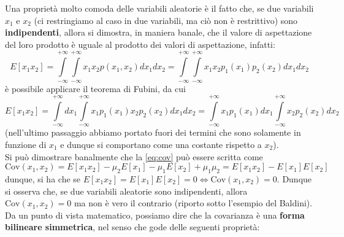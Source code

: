 \documentclass{report}
\begin{document}
Una proprietà molto comoda delle variabili aleatorie è il fatto che, se due variabili $x_1$ e $x_2$ (ci restringiamo al caso in due variabili, ma ciò non è restrittivo) sono \textbf{indipendenti}, allora si dimostra, in maniera banale, che il valore di aspettazione del loro prodotto è uguale al prodotto dei valori di aspettazione, infatti:
$$
E[x_1 x_2] = \int\limits_{-\infty}^{+\infty} \int\limits_{-\infty}^{+\infty} x_1 x_2 p(x_1, x_2)dx_1 dx_2 = \int\limits_{-\infty}^{+\infty} \int\limits_{-\infty}^{+\infty} x_1 x_2 p_1(x_1)p_2(x_2)dx_1 dx_2
$$ 
è possibile applicare il teorema di Fubini, da cui
$$
E[x_1 x_2] = \int\limits_{-\infty}^{+\infty} dx_1 \int\limits_{-\infty}^{+\infty} x_1 p_1(x_1) x_2 p_2(x_2) dx_1dx_2 = \int\limits_{-\infty}^{+\infty} x_1 p_1(x_1) dx_1 \int\limits_{-\infty}^{+\infty} x_2 p_2(x_2) dx_2
$$
(nell'ultimo passaggio abbiamo portato fuori dei termini che sono solamente in funzione di $x_1$ e dunque si comportano come una costante rispetto a $x_2$). \\
\noindent Si può dimostrare banalmente che la \ref{eq:cov} può essere scritta come
$$
	\text{Cov}(x_1, x_2) = E[x_1 x_2] - \mu_2 E[x_1] - \mu_1 E[x_2] + \mu_1 \mu_2 = E[x_1 x_2] - E[x_1] E[x_2]
$$
dunque, si ha che se $E[x_1 x_2] = E[x_1] E[x_2] = 0 \iff \text{Cov}(x_1, x_2) = 0$. Dunque si osserva che, se due variabili aleatorie sono indipendenti, allora $\text{Cov}(x_1, x_2) = 0$ ma non è vero il contrario (riporto sotto l'esempio del Baldini).
\noindent Da un punto di vista matematico, possiamo dire che la covarianza è una \textbf{forma bilineare simmetrica}, nel senso che gode delle seguenti proprietà:
\end{document}
